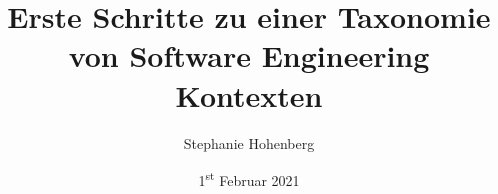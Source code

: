 
\title{Erste Schritte zu einer Taxonomie von Software Engineering Kontexten} 
\newcommand{\Year}{2021}
\date{1\textsuperscript{st} Februar \Year}
\newcommand{\thesisKind}{Master}
\newcommand{\degree}{Master~of~Science}
\newcommand{\versionnumber}{0.1}

\author{Stephanie Hohenberg}
\newcommand{\matrikelno}{5293431}
\newcommand{\email}{stephanie.hohenberg@fu-berlin.de}

\newcommand{\supervisor}{Prof. Dr. Lutz Prechelt}
\newcommand{\supervisorUniversity}{Freie Universität Berlin}
\newcommand{\supervisorDepartment}{Dept. of Computer Science and Mathematics}
\newcommand{\supervisorAG}{Software Engineering Research Group}
\newcommand{\supervisorCountry}{Germany}

\newcommand{\fstAdvisor}{Prof. Dr. Lutz Prechelt}
\newcommand{\fstAdvisorsUniversity}{Freie Universität Berlin} 
\newcommand{\fstAdvisorsDepartment}{Dept. of Computer Science and Mathematics} 
\newcommand{\fstAdvisorsAG}{Software Engineering Research Group}
\newcommand{\fstAdvisorsCountry}{Germany}

\newcommand{\sndAdvisor}{Prof.~Dr.~Heinz~Schweppe}
\newcommand{\sndAdvisorsUniversity}{Freie Universität Berlin} %
\newcommand{\sndAdvisorsDepartment}{Dept. of Computer Science and Mathematics}
\newcommand{\sndAdvisorsAG}{Databases and Information Systems Group}
\newcommand{\sndAdvisorsCountry}{Germany}

\usepackage{float}








